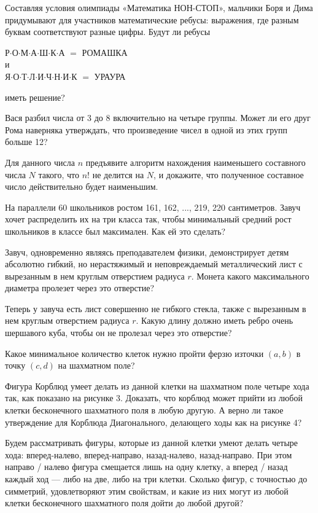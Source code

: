 \begin{itemize}
\itA Составляя условия олимпиады «Математика НОН-СТОП», мальчики Боря и Дима придумывают для участников математические ребусы: выражения, где разным буквам соответствуют разные цифры. Будут ли ребусы
\begin{center}
	Р$\cdot$О$\cdot$М$\cdot$А$\cdot$Ш$\cdot$К$\cdot$А $=$ РОМАШКА\\
	и \\
	Я$\cdot$О$\cdot$Т$\cdot$Л$\cdot$И$\cdot$Ч$\cdot$Н$\cdot$И$\cdot$К $=$ УРАУРА
\end{center}
иметь решение?

\itB Вася разбил числа от 3 до 8 включительно на четыре группы. Может ли его друг Рома наверняка утверждать, что произведение чисел в одной из этих групп больше 12?

\itC Для данного числа $n$ предъявите алгоритм нахождения наименьшего составного числа $N$ такого, что $n!$ не делится на $N$, и докажите, что полученное составное число действительно будет наименьшим.
\end{itemize}

\begin{itemize}
\itA На параллели 60 школьников ростом 161, 162, ..., 219, 220 сантиметров. Завуч хочет распределить их на три класса так, чтобы минимальный средний рост школьников в классе был максимален. Как ей это сделать?

\itB Завуч, одновременно являясь преподавателем физики, демонстрирует детям абсолютно гибкий, но нерастяжимый и неповреждаемый металлический лист с вырезанным в нем круглым отверстием радиуса $r$. Монета какого максимального диаметра пролезет через это отверстие?

\itC Теперь у завуча есть лист совершенно не гибкого стекла, также с вырезанным в нем круглым отверстием радиуса $r$. Какую длину должно иметь ребро очень шершавого куба, чтобы он не пролезал через это отверстие?
\end{itemize}

\begin{itemize}
\itA Какое минимальное количество клеток нужно пройти ферзю из\linebreak точки $(a,b)$ в точку $(c,d)$ на шахматном поле?

\itB Фигура Корблюд умеет делать из данной клетки на шахматном поле четыре хода так, как показано на рисунке 3. Доказать, что корблюд может прийти из любой клетки бесконечного шахматного поля в любую другую. А верно ли такое утверждение для Корблюда Диагонального, делающего ходы как на рисунке 4?

\itC Будем рассматривать фигуры, которые из данной клетки умеют делать четыре хода: вперед-налево, вперед-направо, назад-налево, назад-направо. При этом направо / налево фигура смещается лишь на одну клетку, а вперед / назад каждый ход — либо на две, либо на три клетки. Сколько фигур, с точностью до симметрий, удовлетворяют этим свойствам, и какие из них могут из любой клетки бесконечного шахматного поля дойти до любой другой?
\end{itemize}

